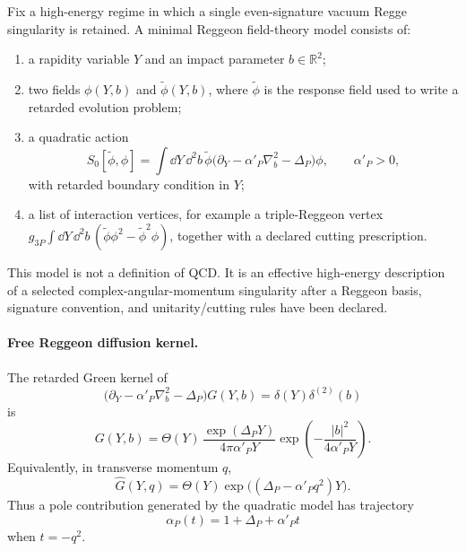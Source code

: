 \begin{definition}
\label{def:minimal-reggeon-field-theory-model}
Fix a high-energy regime in which a single even-signature vacuum Regge
singularity is retained.  A minimal Reggeon field-theory model consists of:
\begin{enumerate}[label=(\roman*)]
\item a rapidity variable \(Y\) and an impact parameter
  \(b\in\mathbb R^2\);
\item two fields \(\phi(Y,b)\) and \(\widetilde\phi(Y,b)\), where
  \(\widetilde\phi\) is the response field used to write a retarded
  evolution problem;
\item a quadratic action
  \begin{equation}
    S_0[\widetilde\phi,\phi]
    =
    \int\dd Y\,\dd^2 b\,
    \widetilde\phi
    \bigl(\partial_Y-\alpha'_P\nabla_b^2-\Delta_P\bigr)\phi,
    \qquad
    \alpha'_P>0,
    \label{eq:minimal-rft-quadratic-action}
  \end{equation}
  with retarded boundary condition in \(Y\);
\item a list of interaction vertices, for example a triple-Reggeon vertex
  \(g_{3P}\int\dd Y\,\dd^2b\,(\widetilde\phi\phi^2-\widetilde\phi^2\phi)\),
  together with a declared cutting prescription.
\end{enumerate}
This model is not a definition of QCD.  It is an effective high-energy
description of a selected complex-angular-momentum singularity after a
Reggeon basis, signature convention, and unitarity/cutting rules have been
declared.
\end{definition}

\paragraph{Free Reggeon diffusion kernel.}
The retarded Green kernel of
\begin{equation}
  \bigl(\partial_Y-\alpha'_P\nabla_b^2-\Delta_P\bigr)G(Y,b)
  =
  \delta(Y)\delta^{(2)}(b)
  \label{eq:free-reggeon-green-equation}
\end{equation}
is
\begin{equation}
  G(Y,b)
  =
  \Theta(Y)\,
  \frac{\exp(\Delta_P Y)}{4\pi\alpha'_P Y}
  \exp\!\left(-\frac{|b|^2}{4\alpha'_P Y}\right).
  \label{eq:free-reggeon-diffusion-kernel}
\end{equation}
Equivalently, in transverse momentum \(q\),
\begin{equation}
  \widehat G(Y,q)=\Theta(Y)\exp\!\bigl((\Delta_P-\alpha'_P q^2)Y\bigr).
  \label{eq:free-reggeon-momentum-kernel}
\end{equation}
Thus a pole contribution generated by the quadratic model has trajectory
\begin{equation}
  \alpha_P(t)=1+\Delta_P+\alpha'_P t
  \label{eq:rft-free-pomeron-trajectory}
\end{equation}
when \(t=-q^2\).

